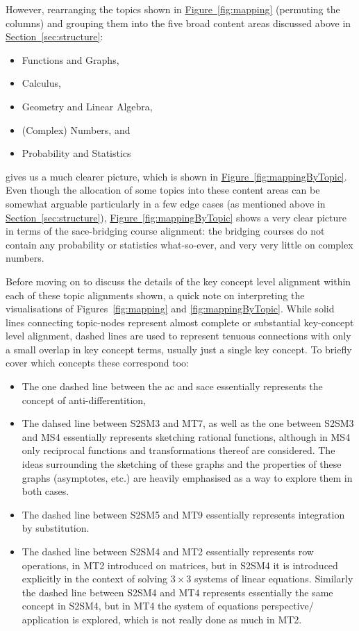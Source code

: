 \documentclass[twoside,12pt,a4paper]{report}
\newcommand{\refsec}[1]{\hyperref[sec:#1]{Section~\ref{sec:#1}}}
\newcommand{\reffig}[1]{\hyperref[fig:#1]{Figure~\ref{fig:#1}}}
\begin{document}
However, rearranging the topics shown in \reffig{mapping} (permuting the columns) and grouping them into the five broad content areas discussed above in \refsec{structure}: 
\begin{itemize}
	\item Functions and Graphs, 
	\item Calculus, 
	\item Geometry and Linear Algebra, 
	\item (Complex) Numbers, and 
	\item Probability and Statistics	
\end{itemize}
gives us a much clearer picture, which is shown in \reffig{mappingByTopic}. Even though the allocation of some topics into these content areas can be somewhat arguable particularly in a few edge cases (as mentioned above in \refsec{structure}), \reffig{mappingByTopic} shows a very clear picture in terms of the \gls{sace}-bridging course alignment: the bridging courses do not contain any probability or statistics what-so-ever, and very very little on complex numbers. 

Before moving on to discuss the details of the key concept level alignment within each of these topic alignments shown, a quick note on interpreting the visualisations of Figures~\ref{fig:mapping} and \ref{fig:mappingByTopic}. While solid lines connecting topic-nodes represent almost complete or substantial key-concept level alignment, dashed lines are used to represent tenuous connections with only a small overlap in key concept terms, usually just a single key concept. To briefly cover which concepts these correspond too:
\begin{itemize}
	\item The one dashed line between the \gls{ac} and \gls{sace} essentially represents the concept of anti-differentition,
	\item The dahsed line between S2SM3 and MT7, as well as the one between S2SM3 and MS4 essentially represents sketching rational functions, although in MS4 only reciprocal functions and transformations thereof are considered. The ideas surrounding the sketching of these graphs and the properties of these graphs (asymptotes, etc.) are heavily emphasised as a way to explore them in both cases.
	\item The dashed line between S2SM5 and MT9 essentially represents integration by substitution.
	\item The dashed line between S2SM4 and MT2 essentially represents row operations, in MT2 introduced on matrices, but in S2SM4 it is introduced explicitly in the context of solving $3 \times 3$ systems of linear equations. Similarly the dashed line between S2SM4 and MT4 represents essentially the same concept in S2SM4, but in MT4 the system of equations perspective/ application is explored, which is not really done as much in MT2.
\end{itemize}
\end{document}
